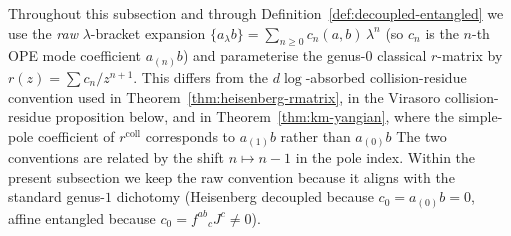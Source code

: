 \begin{remark}
\label{rem:lambda-bracket-convention-dichotomy}
Throughout this subsection and through
Definition~\ref{def:decoupled-entangled} we use the
\emph{raw} $\lambda$-bracket expansion
$\{a{}_\lambda b\}=\sum_{n\ge0}c_n(a,b)\,\lambda^n$
\textup{(}so $c_n$ is the $n$-th OPE mode coefficient
$a_{(n)}b$\textup{)} and parameterise the genus-$0$ classical
$r$-matrix by $r(z)=\sum c_n/z^{n+1}$. This differs from the
$d\log$-absorbed collision-residue convention used in
Theorem~\ref{thm:heisenberg-rmatrix}, in the Virasoro
collision-residue proposition below, and in
Theorem~\ref{thm:km-yangian}, where the simple-pole
coefficient of $r^{\mathrm{coll}}$ corresponds to $a_{(1)}b$
rather than $a_{(0)}b$ The two conventions are
related by the shift $n\mapsto n{-}1$ in the pole index.
Within the present subsection we keep the raw convention
because it aligns with the standard genus-$1$ dichotomy
(Heisenberg decoupled because $c_0=a_{(0)}b=0$, affine
entangled because $c_0=f^{ab}{}_cJ^c\ne0$).
\end{remark}

